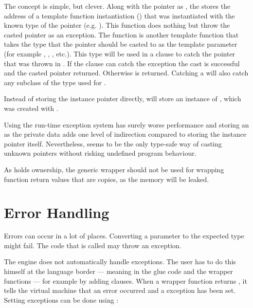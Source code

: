 The concept is simple, but clever. Along with the pointer as , the  stores the address of a template function instantiation () that was instantiated with the known type of the pointer (e.g. ). This function does nothing but throw the casted pointer as an exception. The  function is another template function that takes the type that the pointer should be casted to as the template parameter  (for example , , , etc.). This type will be used in a  clause to catch the pointer that was thrown in . If the  clause can catch the exception the cast is successful and the casted pointer returned. Otherwise  is returned. Catching a  will also catch any subclass of the type used for .

Instead of storing the instance pointer directly,  will store an instance of , which was created with . 

Using the run-time exception system has surely worse performance and storing an  as the private data adds one level of indirection compared to storing the instance pointer itself. Nevertheless,  seems to be the only type-safe way of casting unknown  pointers without risking undefined program behaviour.

As  holds ownership, the generic wrapper should not be used for wrapping function return values that are copies, as the memory will be leaked.

\section{Error Handling}
\label{sec:ErrorHandling}

Errors can occur in a lot of places. Converting a parameter to the expected type might fail. The  code that is called may throw an exception.

The  engine does not automatically handle  exceptions. The  user has to do this himself at the language border --- meaning in the glue code and the wrapper functions --- for example by adding  clauses. When a wrapper function returns , it tells the virtual machine that an error occurred and a \linebreak{} exception has been set. Setting  exceptions can be done using :

